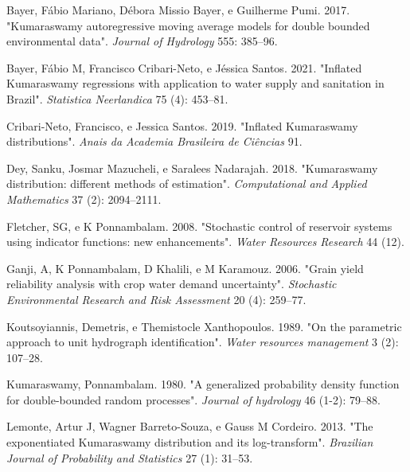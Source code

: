 \documentclass[
]{article}
\newlength{\cslhangindent}
\newlength{\cslentryspacingunit} %
\newenvironment{CSLReferences}[2] %
 {%
  \setlength{\parindent}{0pt}
  \ifodd #1
  \let\oldpar\par
  \def\par{\hangindent=\cslhangindent\oldpar}
  \fi
  \setlength{\parskip}{#2\cslentryspacingunit}
 }%
 {}
\begin{document}
\hypertarget{refs}{}
\begin{CSLReferences}{1}{0}
\leavevmode{}%
Bayer, Fábio Mariano, Débora Missio Bayer, e Guilherme Pumi. 2017.
{"Kumaraswamy autoregressive moving average models for double bounded
environmental data"}. \emph{Journal of Hydrology} 555: 385--96.

\leavevmode{}%
Bayer, Fábio M, Francisco Cribari-Neto, e Jéssica Santos. 2021.
{"Inflated Kumaraswamy regressions with application to water supply and
sanitation in Brazil"}. \emph{Statistica Neerlandica} 75 (4): 453--81.

\leavevmode{}%
Cribari-Neto, Francisco, e Jessica Santos. 2019. {"Inflated Kumaraswamy
distributions"}. \emph{Anais da Academia Brasileira de Ci{ê}ncias} 91.

\leavevmode{}%
Dey, Sanku, Josmar Mazucheli, e Saralees Nadarajah. 2018. {"Kumaraswamy
distribution: different methods of estimation"}. \emph{Computational and
Applied Mathematics} 37 (2): 2094--2111.

\leavevmode{}%
Fletcher, SG, e K Ponnambalam. 2008. {"Stochastic control of reservoir
systems using indicator functions: new enhancements"}. \emph{Water
Resources Research} 44 (12).

\leavevmode{}%
Ganji, A, K Ponnambalam, D Khalili, e M Karamouz. 2006. {"Grain yield
reliability analysis with crop water demand uncertainty"}.
\emph{Stochastic Environmental Research and Risk Assessment} 20 (4):
259--77.

\leavevmode{}%
Koutsoyiannis, Demetris, e Themistocle Xanthopoulos. 1989. {"On the
parametric approach to unit hydrograph identification"}. \emph{Water
resources management} 3 (2): 107--28.

\leavevmode{}%
Kumaraswamy, Ponnambalam. 1980. {"A generalized probability density
function for double-bounded random processes"}. \emph{Journal of
hydrology} 46 (1-2): 79--88.

\leavevmode{}%
Lemonte, Artur J, Wagner Barreto-Souza, e Gauss M Cordeiro. 2013. {"The
exponentiated Kumaraswamy distribution and its log-transform"}.
\emph{Brazilian Journal of Probability and Statistics} 27 (1): 31--53.


\end{CSLReferences}
\end{document}

